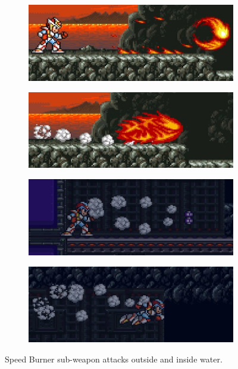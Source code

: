 \begin{figure}[htp]
	\centering
	\begin{subfigure}[t]{0.4\linewidth}
		\includegraphics[width=\linewidth]{figures/X2/weapons/S_burner_1.png}	
	\end{subfigure}
	\begin{subfigure}[t]{0.4\linewidth}
		\centering
		\includegraphics[width=\linewidth]{figures/X2/weapons/S_burner_2.png}	
	\end{subfigure}
	\begin{subfigure}[t]{0.4\linewidth}
		\centering
		\includegraphics[width=\linewidth]{figures/X2/weapons/S_burner_3.png}	
	\end{subfigure}
	\begin{subfigure}[t]{0.4\linewidth}
		\centering
		\includegraphics[width=\linewidth]{figures/X2/weapons/S_burner_4.png}	
	\end{subfigure}
	\caption{Speed Burner sub-weapon attacks outside and inside water.}
\end{figure}


